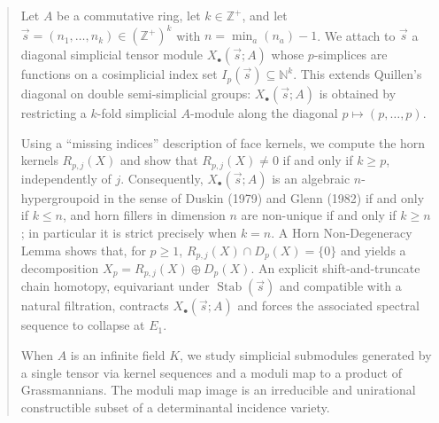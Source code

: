 


\begin{abstract}
Let $A$ be a commutative ring, let $k\in\mathbb{Z}^+$, and let
$\vec{s}=(n_1,\dots,n_k)\in(\mathbb{Z}^+)^k$ with $n=\min_a(n_a)-1$.
We attach to $\vec{s}$ a diagonal simplicial tensor module $X_\bullet(\vec{s};A)$
whose $p$-simplices are functions on a cosimplicial index set
$I_p(\vec{s})\subseteq \mathbb{N}^k$.
This extends Quillen's diagonal on double semi-simplicial groups:
$X_\bullet(\vec{s};A)$ is obtained by restricting a $k$-fold simplicial
$A$-module along the diagonal $p\mapsto(p,\ldots,p)$.

Using a ``missing indices'' description of face kernels, we compute the horn
kernels $R_{p,j}(X)$ and show that $R_{p,j}(X)\neq 0$ if and only if $k\ge p$,
independently of $j$.
Consequently, $X_\bullet(\vec{s};A)$ is an algebraic $n$-hypergroupoid in the
sense of Duskin (1979) and Glenn (1982) if and only if $k\le n$, and horn fillers in dimension
$n$ are non-unique if and only if $k\ge n$; in particular it is strict
precisely when $k=n$.
A Horn Non-Degeneracy Lemma shows that, for $p\ge 1$,
$R_{p,j}(X)\cap D_p(X)=\{0\}$ and yields a decomposition
$X_p=R_{p,j}(X)\oplus D_p(X)$.
An explicit shift-and-truncate chain homotopy, equivariant under
$\operatorname{Stab}(\vec{s})$ and compatible with a natural filtration,
contracts $X_\bullet(\vec{s};A)$ and forces the associated spectral sequence to
collapse at $E_1$.

When $A$ is an infinite field $K$, we study simplicial submodules generated by a
single tensor via kernel sequences and a moduli map to a product of
Grassmannians. The moduli map image is an irreducible and unirational constructible subset
of a determinantal incidence variety.
\end{abstract}
